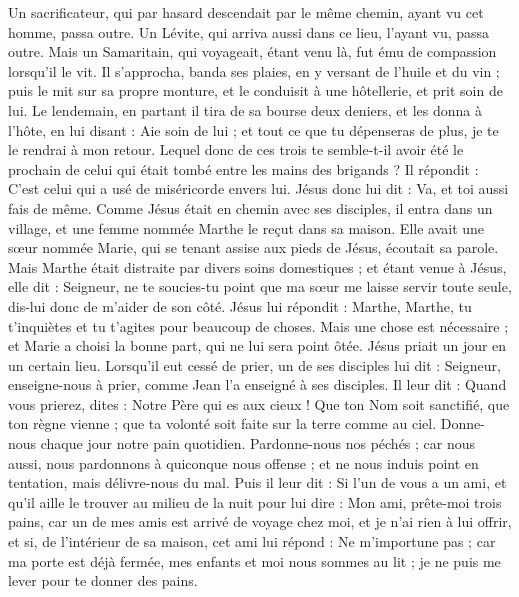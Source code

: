 \begin{multicols}{2}
{Un sacrificateur, qui par hasard descendait par le même chemin, ayant vu cet homme, passa outre.
Un Lévite, qui arriva aussi dans ce lieu, l’ayant vu, passa outre.
Mais un Samaritain, qui voyageait, étant venu là, fut ému de compassion lorsqu’il le vit.
Il s'approcha, banda ses plaies, en y versant de l'huile et du vin ; puis le mit sur sa propre monture, et le conduisit à une hôtellerie, et prit soin de lui.
Le lendemain, en partant il tira de sa bourse deux deniers, et les donna à l'hôte, en lui disant : Aie soin de lui ; et tout ce que tu dépenseras de plus, je te le rendrai à mon retour.
Lequel donc de ces trois te semble-t-il avoir été le prochain de celui qui était tombé entre les mains des brigands ?
Il répondit : C’est celui qui a usé de miséricorde envers lui. Jésus donc lui dit : Va, et toi aussi fais de même.
Comme Jésus était en chemin avec ses disciples, il entra dans un village, et une femme nommée Marthe le reçut dans sa maison.
Elle avait une sœur nommée Marie, qui se tenant assise aux pieds de Jésus, écoutait sa parole.
Mais Marthe était distraite par divers soins domestiques ; et étant venue à Jésus, elle dit : Seigneur, ne te soucies-tu point que ma sœur me laisse servir toute seule, dis-lui donc de m’aider de son côté.
Jésus lui répondit : Marthe, Marthe, tu t'inquiètes et tu t'agites pour beaucoup de choses.
Mais une chose est nécessaire ; et Marie a choisi la bonne part, qui ne lui sera point ôtée.
\TextTitle{[grandeur]}
\VerseOne{}Jésus priait un jour en un certain lieu. Lorsqu’il eut cessé de prier, un de ses disciples lui dit : Seigneur, enseigne-nous à prier, comme Jean l’a enseigné à ses disciples.
Il leur dit : Quand vous prierez, dites : Notre Père qui es aux cieux ! Que ton Nom soit sanctifié, que ton règne vienne ; que ta volonté soit faite sur la terre comme au ciel.
Donne-nous chaque jour notre pain quotidien.
Pardonne-nous nos péchés ; car nous aussi, nous pardonnons à quiconque nous offense ; et ne nous induis point en tentation, mais délivre-nous du mal.
Puis il leur dit : Si l’un de vous a un ami, et qu’il aille le trouver au milieu de la nuit pour lui dire : Mon ami, prête-moi trois pains,
car un de mes amis est arrivé de voyage chez moi, et je n’ai rien à lui offrir,
et si, de l’intérieur de sa maison, cet ami lui répond : Ne m'importune pas ; car ma porte est déjà fermée, mes enfants et moi nous sommes au lit ; je ne puis me lever pour te donner des pains.
}
\end{multicols}
